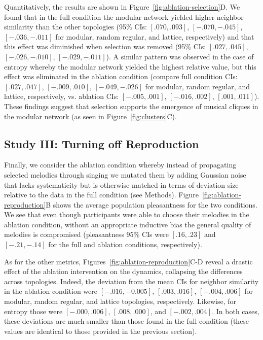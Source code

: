 \documentclass[10pt,letterpaper]{article}
\begin{document}
Quantitatively, the results are shown in Figure~\ref{fig:ablation-selection}D. We found that in the full condition the modular network yielded higher neighbor similarity than the other topologies (95\% CIs: $[.070,.093]$, $[-.070,-.045]$, $[-.036,-.011]$ for modular, random regular, and lattice, respectively) and that this effect was diminished when selection was removed (95\% CIs: $[.027,.045]$, $[-.026,-.010]$, $[-.029,-.011]$). A similar pattern was observed in the case of entropy whereby the modular network yielded the highest relative value, but this effect was eliminated in the ablation condition (compare full condition CIs: $[.027,.047]$, $[-.009,.010]$, $[-.049,-.026]$ for modular, random regular, and lattice, respectively, vs. ablation CIs: $[-.005,.001]$, $[-.016,.002]$, $[.001,.011]$). These findings suggest that selection supports the emergence of musical cliques in the modular network (as seen in Figure~\ref{fig:clusters}C). 

\subsection{Study III: Turning off Reproduction}
Finally, we consider the ablation condition whereby instead of propagating selected melodies through singing we mutated them by adding Gaussian noise that lacks systematicity but is otherwise matched in terms of deviation size relative to the data in the full condition (see Methods). Figure~\ref{fig:ablation-reproduction}B shows the average population pleasantness for the two conditions. We see that even though participants were able to choose their melodies in the ablation condition, without an appropriate inductive bias the general quality of melodies is compromised (pleasantness 95\% CIs were $[.16,.23]$ and $[-.21,-.14]$ for the full and ablation conditions, respectively).

As for the other metrics, Figures~\ref{fig:ablation-reproduction}C-D reveal a drastic effect of the ablation intervention on the dynamics, collapsing the differences across topologies. Indeed, the deviation from the mean CIs for neighbor similarity in the ablation condition were $[-.016,-0.005]$, $[.003,.016]$, $[-.004,.006]$ for modular, random regular, and lattice topologies, respectively. Likewise, for entropy those were $[-.000,.006]$, $[.008,.000]$, and $[-.002,.004]$. In both cases, these deviations are much smaller than those found in the full condition (these values are identical to those provided in the previous section).
\end{document}
